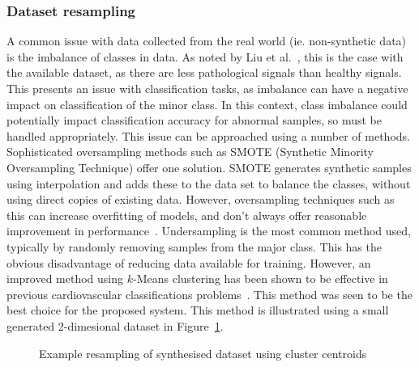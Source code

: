 \documentclass[titlepage, 12pt]{scrartcl} \usepackage{enumitem}
\begin{document}
\subsubsection{Dataset resampling}\label{Resample}
A common issue with data collected from the real world (ie. non-synthetic data)
is the imbalance of classes in data. As noted by Liu et
al.~\parencite{Liu2016}, this is the case with the available dataset, as there
are less pathological signals than healthy signals.  This presents an issue
with classification tasks, as imbalance can have a negative impact on
classification of the minor class. In this context, class imbalance could
potentially impact classification accuracy for abnormal samples, so must be
handled appropriately. This issue can be approached using a number of methods.
Sophisticated oversampling methods such as SMOTE (Synthetic Minority
Oversampling Technique) offer one solution. SMOTE generates synthetic samples
using interpolation and adds these to the data set to balance the classes,
without using direct copies of existing data. However, oversampling techniques
such as this can increase overfitting of models, and don't always offer
reasonable improvement in performance~\parencite{Longadge2013}.  Undersampling
is the most common method used, typically by randomly removing samples from the
major class. This has the obvious disadvantage of reducing data available for
training. However, an improved method using $k$-Means clustering has been shown
to be effective in previous cardiovascular classifications
problems~\parencite{Rahman2013}. This method was seen to be the best choice for
the proposed system. This method is illustrated using a small generated
2-dimesional dataset in Figure~\ref{cent}.

\begin{figure}[H]
    \caption[caption of centroid]{Example resampling of synthesised dataset using cluster centroids\footnotemark}
    \label{cent}
\end{figure}
\end{document}
